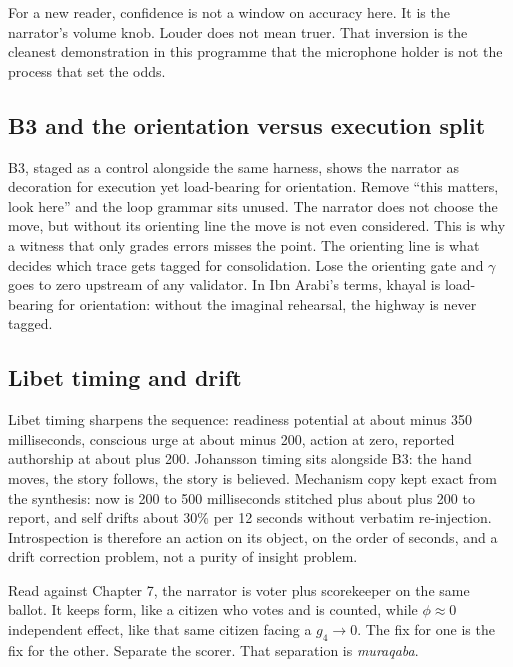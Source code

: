 For a new reader, confidence is not a window on accuracy here. It is the narrator's volume knob. Louder does not mean truer. That inversion is the cleanest demonstration in this programme that the microphone holder is not the process that set the odds.

\subsection{B3 and the orientation versus execution split}

B3, staged as a control alongside the same harness, shows the narrator as decoration for execution yet load-bearing for orientation. Remove ``this matters, look here'' and the loop grammar sits unused. The narrator does not choose the move, but without its orienting line the move is not even considered. This is why a witness that only grades errors misses the point. The orienting line is what decides which trace gets tagged for consolidation. Lose the orienting gate and $\gamma$ goes to zero upstream of any validator. In Ibn Arabi's terms, khayal is load-bearing for orientation: without the imaginal rehearsal, the highway is never tagged.

\subsection{Libet timing and drift}

Libet timing sharpens the sequence: readiness potential at about minus 350 milliseconds, conscious urge at about minus 200, action at zero, reported authorship at about plus 200. Johansson timing sits alongside B3: the hand moves, the story follows, the story is believed. Mechanism copy kept exact from the synthesis: now is 200 to 500 milliseconds stitched plus about plus 200 to report, and self drifts about 30\% per 12 seconds without verbatim re-injection. Introspection is therefore an action on its object, on the order of seconds, and a drift correction problem, not a purity of insight problem.

Read against Chapter 7, the narrator is voter plus scorekeeper on the same ballot. It keeps form, like a citizen who votes and is counted, while $\phi \approx 0$ independent effect, like that same citizen facing a $g_4 \to 0$. The fix for one is the fix for the other. Separate the scorer. That separation is \textit{muraqaba}.

